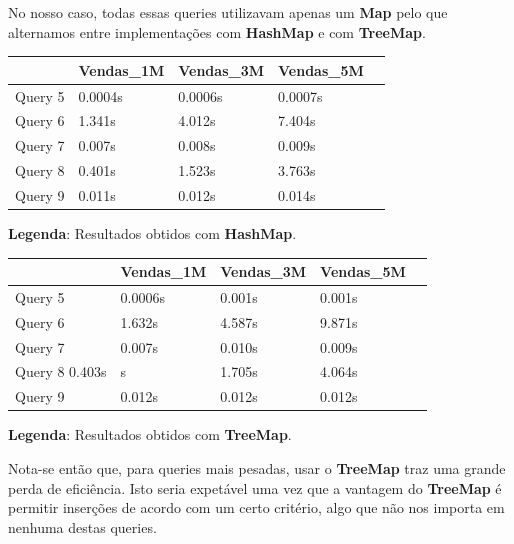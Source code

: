 \documentclass[11pt]{article}
\begin{document}
No nosso caso, todas essas queries utilizavam apenas um \textbf{Map} pelo que alternamos entre implementações com \textbf{HashMap} e com \textbf{TreeMap}.
 
\vspace{0.5cm}
\begin{tabularx}{\textwidth} {
  | >{\centering\arraybackslash}X
  | >{\centering\arraybackslash}X
  | >{\centering\arraybackslash}X
  | >{\centering\arraybackslash}X
  | >{\centering\arraybackslash}X | }
    \hline
     & Vendas\_1M  & Vendas\_3M  & Vendas\_5M  \\
    \hline
    Query 5 & 0.0004s & 0.0006s & 0.0007s \\ 
    \hline
    Query 6 & 1.341s & 4.012s & 7.404s  \\
    \hline
    Query 7 & 0.007s & 0.008s & 0.009s \\
    \hline
    Query 8 & 0.401s & 1.523s & 3.763s \\
    \hline
    Query 9 & 0.011s & 0.012s & 0.014s  \\
    \hline
\end{tabularx}
\textbf{Legenda}: Resultados obtidos com \textbf{HashMap}.
 
\vspace{0.5cm}
\begin{tabularx}{\textwidth} {
  | >{\centering\arraybackslash}X
  | >{\centering\arraybackslash}X
  | >{\centering\arraybackslash}X
  | >{\centering\arraybackslash}X
  | >{\centering\arraybackslash}X | }
    \hline
     & Vendas\_1M  & Vendas\_3M  & Vendas\_5M  \\
    \hline
    Query 5 & 0.0006s & 0.001s & 0.001s \\ 
    \hline
    Query 6 & 1.632s & 4.587s & 9.871s  \\
    \hline
    Query 7 & 0.007s & 0.010s & 0.009s \\
    \hline
    Query 8 0.403s& s & 1.705s & 4.064s \\
    \hline
    Query 9 & 0.012s & 0.012s & 0.012s  \\
    \hline
\end{tabularx}
\textbf{Legenda}: Resultados obtidos com \textbf{TreeMap}.
\vspace{0.5cm}

Nota-se então que, para queries mais pesadas, usar o \textbf{TreeMap} traz uma grande perda de eficiência. Isto seria expetável uma vez que a vantagem do \textbf{TreeMap} é permitir inserções de acordo com um certo critério, algo que não nos importa em nenhuma destas queries.
\end{document}
